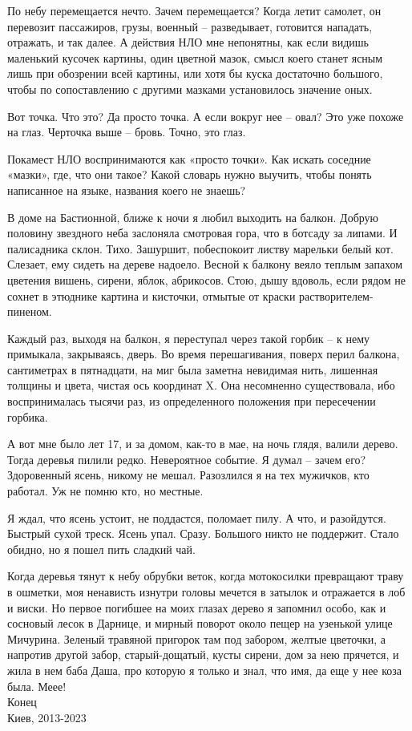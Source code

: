 По небу перемещается нечто. Зачем перемещается? Когда летит самолет, он перевозит пассажиров, грузы, военный – разведывает, готовится нападать, отражать, и так далее. А действия НЛО мне непонятны, как если видишь маленький кусочек картины, один цветной мазок, смысл коего станет ясным лишь при обозрении всей картины, или хотя бы куска достаточно большого, чтобы по сопоставлению с другими мазками установилось значение оных.

Вот точка. Что это? Да просто точка. А если вокруг нее – овал? Это уже похоже на глаз. Черточка выше – бровь. Точно, это глаз.

Покамест НЛО воспринимаются как «просто точки». Как искать соседние «мазки», где, что они такое? Какой словарь нужно выучить, чтобы понять написанное на языке, названия коего не знаешь?

В доме на Бастионной, ближе к ночи я любил выходить на балкон. Добрую половину звездного неба заслоняла смотровая гора, что в ботсаду за липами. И палисадника склон. Тихо. Зашуршит, побеспокоит листву марельки белый кот. Слезает, ему сидеть на дереве надоело. Весной к балкону веяло теплым запахом цветения вишень, сирени, яблок, абрикосов. Стою, дышу вдоволь, если рядом не сохнет в этюднике картина и кисточки, отмытые от краски растворителем-пиненом.

Каждый раз, выходя на балкон, я переступал через такой горбик – к нему примыкала, закрываясь, дверь. Во время перешагивания, поверх перил балкона, сантиметрах в пятнадцати, на миг была заметна невидимая нить, лишенная толщины и цвета, чистая ось координат X. Она несомненно существовала, ибо воспринималась тысячи раз, из определенного положения при пересечении горбика.

А вот мне было лет 17, и за домом, как-то в мае, на ночь глядя, валили дерево. Тогда деревья пилили редко. Невероятное событие. Я думал – зачем его? Здоровенный ясень, никому не мешал. Разозлился я на тех мужичков, кто работал. Уж не помню кто, но местные.

Я ждал, что ясень устоит, не поддастся, поломает пилу. А что, и разойдутся. Быстрый сухой треск. Ясень упал. Сразу. Большого никто не поддержит. Стало обидно, но я пошел пить сладкий чай. 

Когда деревья тянут к небу обрубки веток, когда мотокосилки превращают траву в ошметки, моя ненависть изнутри головы мечется в затылок и отражается в лоб и виски. Но первое погибшее на моих глазах дерево я запомнил особо, как и сосновый лесок в Дарнице, и мирный поворот около пещер на узенькой улице Мичурина. Зеленый травяной пригорок там под забором, желтые цветочки, а напротив другой забор, старый-дощатый, кусты сирени, дом за нею прячется, и жила в нем баба Даша, про которую я только и знал, что имя, да еще у нее коза была. Меее!\\

Конец\\

Киев, 2013-2023\\
